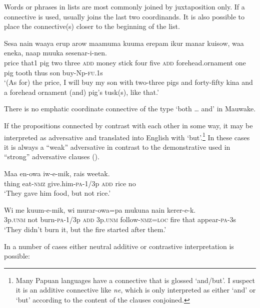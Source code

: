 Words or phrases in lists are most commonly joined by juxtaposition only. If a connective is used,  usually joins the last two  coordinands. It is also possible to place the connective(s) closer to the beginning of the list.

\ea%
\label{ex:3:x1359}
\gll Sesa nain waaya erup arow  maamuma kuuma erepam ikur  manar kuisow, waa eneka, naap muuka sesenar-i-nen.\\
price that1 pig two three \textsc{add} money stick four five \textsc{add} forehead.ornament one pig tooth thus son buy-Np-\textsc{fu}.1s\\
\glt`(As for) the price, I will buy my son with two-three pigs and forty-fifty kina and a forehead ornament (and) pig's tusk(s), like that.'
\z

There is no emphatic coordinate connective of the type `both {\dots} and' in Mauwake. 

If the propositions connected by  contrast with each other in some way, it may be interpreted as adversative and translated into English with `but'.\footnote{Many Papuan languages have a connective that is glossed `and/but'. I suspect it is an additive connective like \textit{ne}, which is only interpreted as either `and' or `but' according to the content of the clauses conjoined.} In these cases it is always a ``weak'' adversative in contrast to the demonstrative  used in ``strong'' adversative clauses ().

\ea%
\label{ex:3:x715}
\gll Maa en-owa iw-e-mik,  rais weetak. \\
thing eat-\textsc{nmz} give.him-\textsc{pa}-1/3p \textsc{add} rice no\\
\glt`They gave him food, but not rice.'
\z

\ea%
\label{ex:3:x716}
\gll Wi me kuum-e-mik,  wi murar-owa=pa mukuna nain kerer-e-k. \\
3p.\textsc{unm} not burn-\textsc{pa}-1/3p \textsc{add} 3p.\textsc{unm} follow-\textsc{nmz}=\textsc{loc} fire that appear-\textsc{pa}-3s\\
\glt`They didn't burn it, but the fire started after them.'
\z

In a number of cases either neutral additive or contrastive interpretation is possible:

